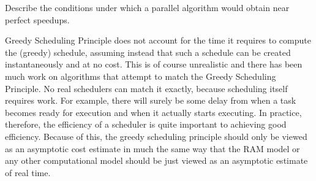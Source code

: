 \begin{cluster}
\label{grp:xrcs:analysis::models::describe}

\begin{exercise}
\label{xrcs:analysis::models::describe}
Describe the conditions under which a parallel algorithm would obtain
near perfect speedups.

\end{exercise}
\end{cluster}

\begin{cluster}
\label{grp:rmrk:analysis::models::greedy}

\begin{remark}
\label{rmrk:analysis::models::greedy}
Greedy Scheduling Principle does not account for the time it requires
to compute the (greedy) schedule, assuming instead that such a
schedule can be created instantaneously and at no cost.
This is of course unrealistic and there has been much work on
algorithms that attempt to match the Greedy Scheduling Principle.
No real schedulers can match it exactly, because scheduling itself
requires work.
For example, there will surely be some delay from when a task becomes
ready for execution and when it actually starts executing.
In practice, therefore, the efficiency of a scheduler is quite
important to achieving good efficiency.  
Because of this, the greedy scheduling principle should only be viewed
as an asymptotic cost estimate in much the same way that the RAM model
or any other computational model should be just viewed as an
asymptotic estimate of real time.

\end{remark}
\end{cluster}

